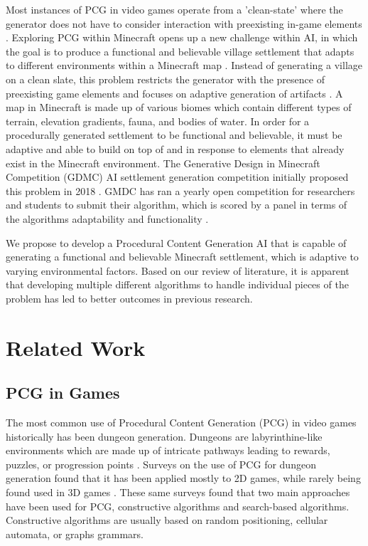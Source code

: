 \documentclass[11pt, oneside]{article}
\begin{document}
\begin{normalsize}
Most instances of PCG in video games operate from a 'clean-state' where the generator does not have to consider interaction with preexisting in-game elements \cite{green_organic_2019}. Exploring PCG within Minecraft opens up a new challenge within AI, in which the goal is to produce a functional and believable village settlement that adapts to different environments within a Minecraft map \cite{salge_generative_2019}. Instead of generating a village on a clean slate, this problem restricts the generator with the presence of preexisting game elements and focuses on adaptive generation of artifacts \cite{green_organic_2019}. A map in Minecraft is made up of various biomes which contain different types of terrain, elevation gradients, fauna, and bodies of water. In order for a procedurally generated settlement to be functional and believable, it must be adaptive and able to build on top of and in response to elements that already exist in the Minecraft environment. The Generative Design in Minecraft Competition (GDMC) AI settlement generation competition initially proposed this problem in 2018 \cite{salge_generative_2018}. GMDC has ran a yearly open competition for researchers and students to submit their algorithm, which is scored by a panel in terms of the algorithms adaptability and functionality \cite{fridh_settlement_nodate}. 

We propose to develop a Procedural Content Generation AI that is capable of generating a functional and believable Minecraft settlement, which is adaptive to varying environmental factors. Based on our review of literature, it is apparent that developing multiple different algorithms to handle individual pieces of the problem has led to better outcomes in previous research. 

\newpage

\section{Related Work}
\label{Related Work}

\subsection{PCG in Games}

The most common use of Procedural Content Generation (PCG) in video games historically has been dungeon generation. Dungeons are labyrinthine-like environments which are made up of intricate pathways leading to rewards, puzzles, or progression points \cite{van2013procedural}. Surveys on the use of PCG for dungeon generation found that it has been applied mostly to 2D games, while rarely being found used in 3D games \cite{viana2019survey}. These same surveys found that two main approaches have been used for PCG, constructive algorithms and search-based algorithms. Constructive algorithms are usually based on random positioning, cellular automata, or graphs grammars. 


\end{normalsize}
\end{document}
